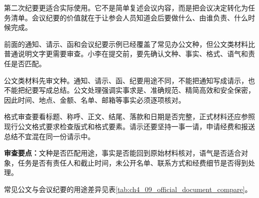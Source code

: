 第二次纪要更适合实际使用。它不是简单复述会议内容，而是把会议决定转化为任务清单。会议纪要的价值就在于让参会人员知道会后要做什么、由谁负责、什么时候完成。

前面的通知、请示、函和会议纪要示例已经覆盖了常见办公文种，但公文类材料比普通说明文字更需要审查。小李在提交前，要先确认文种、事实、格式、语气和责任是否匹配。

\begin{critiquebox}
公文类材料先审文种。通知、请示、函、纪要用途不同，不能把通知写成请示，也不能把纪要写成总结。公文处理强调实事求是、准确规范、精简高效和安全保密\footnotemark，因此时间、地点、金额、名单、邮箱等事实必须逐项核对。

格式审查要看标题、称呼、正文、结尾、落款和日期是否完整，正式材料还应参照现行公文格式要求检查版式和格式要素\footnotemark。请示还要坚持一事一请，申请经费和报送总结不宜混在同一份请示中\footnotemark。

\textbf{审查要点：}文种是否匹配用途，事实是否能回到原始材料核对，语气是否适合对象，任务是否有责任人和截止时间，未公开名单、联系方式和经费细节是否得到处理。
\end{critiquebox}
\addtocounter{footnote}{-3}



常见公文与会议纪要的用途差异见表\ref{tab:ch4_09_official_document_compare}。

